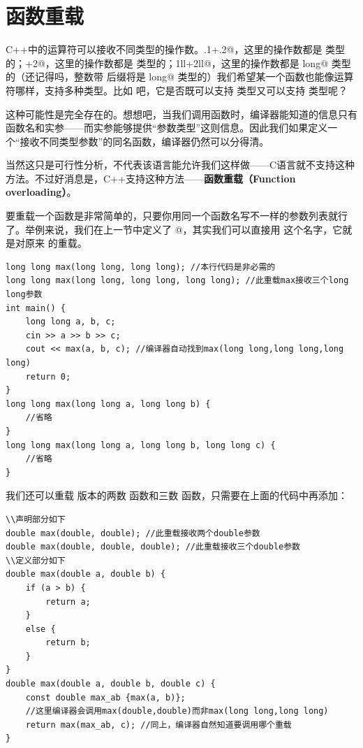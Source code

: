 \section{函数重载}
C++中的运算符可以接收不同类型的操作数。\lstinline@.1+.2@，这里的操作数都是 \lstinline@double@ 类型的；+2@，这里的操作数都是 \lstinline@int@ 类型的；\lstinline@1ll+2ll@，这里的操作数都是 \lstinline@long long@ 类型的（还记得吗，整数带 \lstinline@ll@ 后缀将是 \lstinline@long long@ 类型的）我们希望某一个函数也能像运算符哪样，支持多种类型。比如 \lstinline@max@ 吧，它是否既可以支持 \lstinline@double@ 类型又可以支持 \lstinline@int@ 类型呢？\par
这种可能性是完全存在的。想想吧，当我们调用函数时，编译器能知道的信息只有函数名和实参——而实参能够提供``参数类型''这则信息。因此我们如果定义一个``接收不同类型参数''的同名函数，编译器仍然可以分得清。\par
当然这只是可行性分析，不代表该语言能允许我们这样做——C语言就不支持这种方法。不过好消息是，C++支持这种方法——\textbf{函数重载（Function overloading）}。\par
要重载一个函数是非常简单的，只要你用同一个函数名写不一样的参数列表就行了。举例来说，我们在上一节中定义了 @，其实我们可以直接用 \lstinline@max@ 这个名字，它就是对原来 \lstinline@max@ 的重载。
\begin{lstlisting}
long long max(long long, long long); //本行代码是非必需的
long long max(long long, long long, long long); //此重载max接收三个long long参数
int main() {
    long long a, b, c;
    cin >> a >> b >> c;
    cout << max(a, b, c); //编译器自动找到max(long long,long long,long long)
    return 0;
}
long long max(long long a, long long b) {
    //省略
}
long long max(long long a, long long b, long long c) {
    //省略
}
\end{lstlisting}
我们还可以重载 \lstinline@double@ 版本的两数 \lstinline@max@ 函数和三数 \lstinline@max@ 函数，只需要在上面的代码中再添加：
\begin{lstlisting}
\\声明部分如下
double max(double, double); //此重载接收两个double参数
double max(double, double, double); //此重载接收三个double参数
\\定义部分如下
double max(double a, double b) {
    if (a > b) {
        return a;
    }
    else {
        return b;
    }
}
double max(double a, double b, double c) {
    const double max_ab {max(a, b)};
    //这里编译器会调用max(double,double)而非max(long long,long long)
    return max(max_ab, c); //同上，编译器自然知道要调用哪个重载
}
\end{lstlisting}
